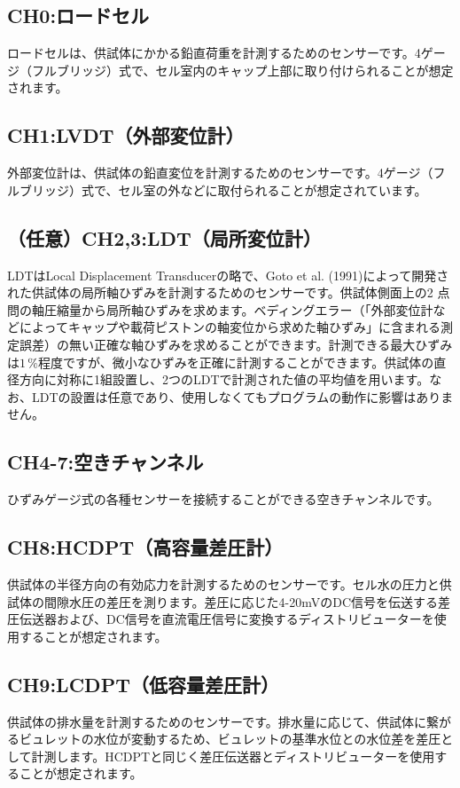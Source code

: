 \subsection{CH0:ロードセル}
ロードセルは、供試体にかかる鉛直荷重を計測するためのセンサーです。4ゲージ（フルブリッジ）式で、セル室内のキャップ上部に取り付けられることが想定されます。

\subsection{CH1:LVDT（外部変位計）}
外部変位計は、供試体の鉛直変位を計測するためのセンサーです。4ゲージ（フルブリッジ）式で、セル室の外などに取付られることが想定されています。

\subsection{（任意）CH2,3:LDT（局所変位計）}
LDTはLocal Displacement Transducerの略で、Goto et al. (1991)によって開発された供試体の局所軸ひずみを計測するためのセンサーです。供試体側面上の2
点問の軸圧縮量から局所軸ひずみを求めます。ベディングエラー（「外部変位計などによってキャップや載荷ピストンの軸変位から求めた軸ひずみ」に含まれる測定誤差）の無い正確な軸ひずみを求めることができます。計測できる最大ひずみは$1\,\%$程度ですが、微小なひずみを正確に計測することができます。供試体の直径方向に対称に1組設置し、2つのLDTで計測された値の平均値を用います。なお、LDTの設置は任意であり、使用しなくてもプログラムの動作に影響はありません。

\subsection{CH4-7:空きチャンネル}
ひずみゲージ式の各種センサーを接続することができる空きチャンネルです。

\subsection{CH8:HCDPT（高容量差圧計）}
供試体の半径方向の有効応力を計測するためのセンサーです。セル水の圧力と供試体の間隙水圧の差圧を測ります。差圧に応じた4-20mVのDC信号を伝送する差圧伝送器および、DC信号を直流電圧信号に変換するディストリビューターを使用することが想定されます。

\subsection{CH9:LCDPT（低容量差圧計）}
供試体の排水量を計測するためのセンサーです。排水量に応じて、供試体に繋がるビュレットの水位が変動するため、ビュレットの基準水位との水位差を差圧として計測します。HCDPTと同じく差圧伝送器とディストリビューターを使用することが想定されます。

